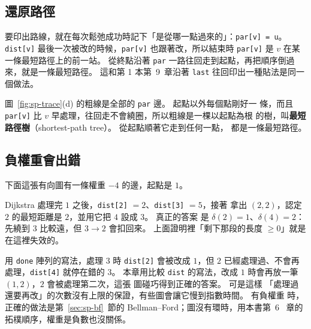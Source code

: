 \subsection{還原路徑}
\label{sec:sp-path}

要印出路線，就在每次鬆弛成功時記下「是從哪一點過來的」：\texttt{par[v] = u}。
\texttt{dist[v]} 最後一次被改的時候，\texttt{par[v]} 也跟著改，所以結束時
\texttt{par[v]} 是 $v$ 在某一條最短路徑上的前一站。 從終點沿著 \texttt{par}
一路往回走到起點，再把順序倒過來，就是一條最短路徑。 這和第 1 本第~9~章沿著
\texttt{last} 往回印出一種貼法是同一個做法。

圖~\ref{fig:sp-trace}(d) 的粗線是全部的 \texttt{par} 邊。 起點以外每個點剛好一
條，而且 \texttt{par[v]} 比 $v$ 早處理，往回走不會繞圈，所以粗線是一棵以起點為根
的樹，叫\textbf{最短路徑樹}（shortest-path tree）。 從起點順著它走到任何一點，
都是一條最短路徑。

\subsection{負權重會出錯}
\label{sec:sp-negative}

下面這張有向圖有一條權重 $-4$ 的邊，起點是 $1$。

\begin{center}
\label{fig:sp-neg}
\end{center}

Dijkstra 處理完 $1$ 之後，\texttt{dist[2]} $= 2$、\texttt{dist[3]} $= 5$，接著
拿出 $(2, 2)$，認定 $2$ 的最短距離是 $2$，並用它把 $4$ 設成 $3$。 真正的答案
是 $\delta(2) = 1$、$\delta(4) = 2$：先繞到 $3$ 比較遠，但 $3 \to 2$ 會扣回來。
上面證明裡「剩下那段的長度 $\ge 0$」就是在這裡失效的。

用 \texttt{done} 陣列的寫法，處理 $3$ 時 \texttt{dist[2]} 會被改成 $1$，但 $2$
已經處理過、不會再處理，\texttt{dist[4]} 就停在錯的 $3$。 本章用比較
\texttt{dist} 的寫法，改成 $1$ 時會再放一筆 $(1, 2)$，$2$ 會被處理第二次，這張
圖碰巧得到正確的答案。 可是這樣
「處理過還要再改」的次數沒有上限的保證，有些圖會讓它慢到指數時間。 有負權重
時，正確的做法是第~\ref{sec:sp-bf}~節的 Bellman--Ford；圖沒有環時，用本書第~6~
章的拓樸順序，權重是負數也沒關係。

